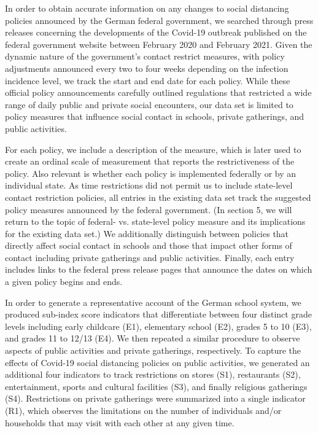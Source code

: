 In order to obtain accurate information on any changes to social distancing policies announced by the German federal government, we searched through press releases concerning the developments of the Covid-19 outbreak published on the federal government website between February 2020 and February 2021. Given the dynamic nature of the government’s contact restrict measures, with policy adjustments announced every two to four weeks depending on the infection incidence level, we track the start and end date for each policy. While these official policy announcements carefully outlined regulations that restricted a wide range of daily public and private social encounters, our data set is limited to policy measures that influence social contact in schools, private gatherings, and public activities. 

For each policy, we include a description of the measure, which is later used to create an ordinal scale of measurement that reports the restrictiveness of the policy. Also relevant is whether each policy is implemented federally or by an individual state. As time restrictions did not permit us to include state-level contact restriction policies, all entries in the existing data set track the suggested policy measures announced by the federal government. (In section 5, we will return to the topic of federal- vs. state-level policy measure and its implications for the existing data set.) We additionally distinguish between policies that directly affect social contact in schools and those that impact other forms of contact including private gatherings and public activities. Finally, each entry includes links to the federal press release pages that announce the dates on which a given policy begins and ends. 

In order to generate a representative account of the German school system, we produced sub-index score indicators that differentiate between four distinct grade levels including early childcare (E1), elementary school (E2), grades 5 to 10 (E3), and grades 11 to 12/13 (E4). We then repeated a similar procedure to observe aspects of public activities and private gatherings, respectively. To capture the effects of Covid-19 social distancing policies on public activities, we generated an additional four indicators to track restrictions on stores (S1), restaurants (S2), entertainment, sports and cultural facilities (S3), and finally religious gatherings (S4). Restrictions on private gatherings were summarized into a single indicator (R1), which observes the limitations on the number of individuals and/or households that may visit with each other at any given time. 

